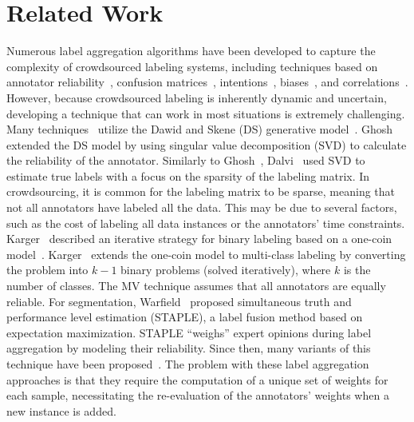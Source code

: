 \section{Related Work}\label{sec:crowd.relatedwork}
Numerous label aggregation algorithms have been developed to capture the complexity of crowdsourced labeling systems, including techniques based on annotator reliability~\cite{bi_Learning_2014,demartini_Zencrowd_2012}, confusion matrices~\cite{raykar_Learning_2010,zhang_Spectral_2014}, intentions~\cite{bi_Learning_2014,kurve_MultiCategory_2015}, biases~\cite{zhang_Imbalanced_2013,hernandez-gonzalez_Note_2019, welinder_Multidimensional_2010}, and correlations~\cite{ma_Gradient_2020}. However, because crowdsourced labeling is inherently dynamic and uncertain, developing a technique that can work in most situations is extremely challenging. Many techniques~\cite{liu_Variational_2012,karger_Budget_2014,raykar_Learning_2010,dalvi_Aggregating_2013,ghosh_Who_2011} utilize the Dawid and Skene (DS) generative model~\cite{dawid_Maximum_1979}. Ghosh~\cite{ghosh_Who_2011} extended the DS model by using singular value decomposition (SVD) to calculate the reliability of the annotator. Similarly to Ghosh~\cite{ghosh_Who_2011}, Dalvi~\cite{dalvi_Aggregating_2013} used SVD to estimate true labels with a focus on the sparsity of the labeling matrix. In crowdsourcing, it is common for the labeling matrix to be sparse, meaning that not all annotators have labeled all the data. This may be due to several factors, such as the cost of labeling all data instances or the annotators' time constraints. Karger~\cite{karger_Budget_2014} described an iterative strategy for binary labeling based on a one-coin model~\cite{ghosh_Who_2011}. Karger~\cite{karger_Budget_2014} extends the one-coin model to multi-class labeling by converting the problem into $k-1 $ binary problems (solved iteratively), where $k $ is the number of classes.
The MV technique assumes that all annotators are equally reliable. For segmentation, Warfield~\cite{warfield_Simultaneous_2004} proposed simultaneous truth and performance level estimation (STAPLE), a label fusion method based on expectation maximization. STAPLE ``weighs'' expert opinions during label aggregation by modeling their reliability. Since then, many variants of this technique have been proposed~\cite{winzeck_ISLES_2018,commowick_Objective_2018,asman_Robust_2011,asman_Formulating_2012, eugenioiglesias_Unified_2013, jorgecardoso_STEPS_2013,asman_NonLocal_2013,akhondi-asl_Logarithmic_2014}. The problem with these label aggregation approaches is that they require the computation of a unique set of weights for each sample, necessitating the re-evaluation of the annotators' weights when a new instance is added.
